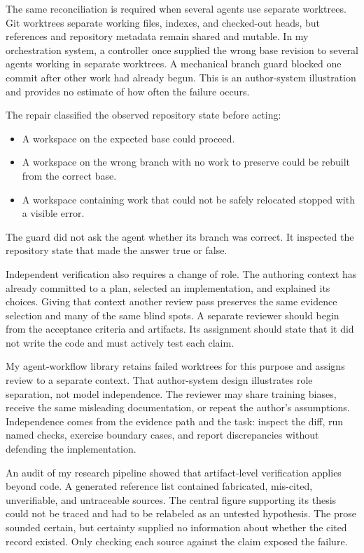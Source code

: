 The same reconciliation is required when several agents use separate worktrees. Git worktrees separate working files, indexes, and checked-out heads, but references and repository metadata remain shared and mutable. In my orchestration system, a controller once supplied the wrong base revision to several agents working in separate worktrees. A mechanical branch guard blocked one commit after other work had already begun. This is an author-system illustration and provides no estimate of how often the failure occurs.


The repair classified the observed repository state before acting:

\begin{itemize}
\tightlist
\item
  A workspace on the expected base could proceed.
\item
  A workspace on the wrong branch with no work to preserve could be rebuilt from the correct base.
\item
  A workspace containing work that could not be safely relocated stopped with a visible error.
\end{itemize}

The guard did not ask the agent whether its branch was correct. It inspected the repository state that made the answer true or false.

Independent verification also requires a change of role. The authoring context has already committed to a plan, selected an implementation, and explained its choices. Giving that context another review pass preserves the same evidence selection and many of the same blind spots. A separate reviewer should begin from the acceptance criteria and artifacts. Its assignment should state that it did not write the code and must actively test each claim.

My agent-workflow library retains failed worktrees for this purpose and assigns review to a separate context. That author-system design illustrates role separation, not model independence. The reviewer may share training biases, receive the same misleading documentation, or repeat the author's assumptions. Independence comes from the evidence path and the task: inspect the diff, run named checks, exercise boundary cases, and report discrepancies without defending the implementation.

An audit of my research pipeline showed that artifact-level verification applies beyond code. A generated reference list contained fabricated, mis-cited, unverifiable, and untraceable sources. The central figure supporting its thesis could not be traced and had to be relabeled as an untested hypothesis. The prose sounded certain, but certainty supplied no information about whether the cited record existed. Only checking each source against the claim exposed the failure.

